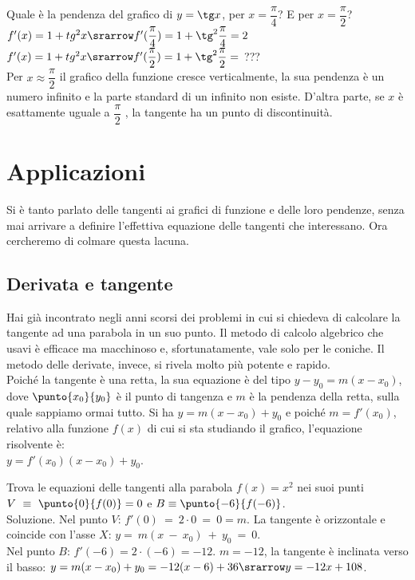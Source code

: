 \begin {esempio}
Quale è la pendenza del grafico di $y=\tg x$, per $x=\dfrac{\pi}{4}$? E per
$x=\dfrac{\pi}{2}$?\\
$f'(x)=1+tg^2 x\srarrow f'(\dfrac{\pi}{4})=1+\tg^2\dfrac{\pi}{4}=2$\\
$f'(x)=1+tg^2 x\srarrow f'(\dfrac{\pi}{2})=1+\tg^2\dfrac{\pi}{2}=$ ???\\
Per $x\approx\dfrac{\pi}{2}$ il grafico della funzione cresce verticalmente,
la sua pendenza è un numero infinito e la parte standard di un infinito non
esiste. D'altra parte, se $x$ è esattamente uguale a $\dfrac{\pi}{2}$ ,
la tangente ha un punto di discontinuità.
\end {esempio}


\section{Applicazioni}
\label{sec:diff01_applicazioni}
Si è tanto parlato delle tangenti ai grafici di funzione e delle loro 
pendenze,
senza mai arrivare a definire l'effettiva equazione delle tangenti che
interessano. Ora cercheremo di colmare questa lacuna.

\subsection{Derivata e tangente}
 Hai già incontrato negli anni scorsi dei problemi in cui si chiedeva di 
 calcolare la tangente ad una parabola in un suo punto. Il metodo di 
calcolo 
 algebrico che usavi è efficace ma macchinoso e, sfortunatamente, vale solo 
 per le coniche. Il metodo delle derivate, invece, si rivela
 molto più potente e rapido.\\
 Poiché la tangente è una retta, la sua equazione è del tipo 
$y-y_0=m(x-x_0)$, 
 dove  $\punto{x_0}{y_0}$ è il punto di tangenza 
 e $m$ è la pendenza della retta, sulla quale sappiamo ormai tutto.
 Si ha $y=m(x-x_0)+y_0$ e poiché $m=f'(x_0)$, relativo alla funzione $f(x)$
 di cui si sta studiando il grafico, l'equazione risolvente è:\\
 $y=f'(x_0)(x-x_0)+y_0$.
 
\begin{esempio}
  Trova le equazioni delle tangenti alla parabola $f(x)=x^2$ nei suoi punti
  $V~\equiv~\punto{0}{f(0)}=0$ e $B\equiv\punto{-6}{f(-6)}$.\\
  Soluzione. Nel punto $V$: $f'(0)~=~2\cdot 0~=~0=m$. La tangente è 
  orizzontale e coincide con l'asse $X$: $y=~m(x~-~x_0)~+~y_0~=~0$.\\
  Nel punto $B$: $f'(-6)=2\cdot (-6)=-12$. $m=-12$, la tangente è inclinata
  verso il basso:
  $y=m(x-x_0)+y_0= -12(x-6)+36\srarrow y=-12x+108$.
 \end{esempio}
 
